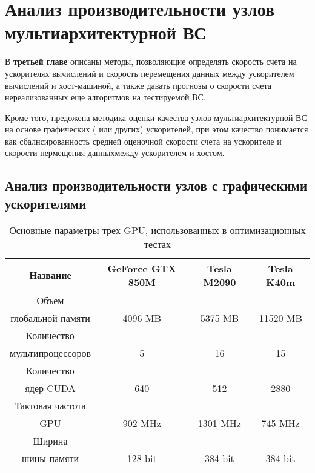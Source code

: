 \chapter{Анализ производительности узлов мультиархитектурной ВС} \label{chapt3}
В \textbf{третьей главе} описаны методы, позволяющие определять скорость счета на ускорителях вычислений и скорость перемещения данных между ускорителем вычислений и хост-машиной, а также давать прогнозы о скорости счета нереализованных еще алгоритмов на тестируемой ВС.

Кроме того, предожена методика оценки качества узлов мультиархитектурной ВС на основе графических ( или других) ускорителей, при этом качество понимается как сбалнсированность средней оценочной скорости счета на ускорителе и скорости пермещения данныхмежду ускорителем и хостом. 

\section{Анализ производительности узлов с графическими ускорителями} \label{sect3_1}

\begin{table}[ht]
	\begin{center}
		\caption{Основные параметры трех GPU, использованных в оптимизационных тестах}
		\begin{tabular}{|c|c|c|c|}
			\hline
			Название                &  GeForce GTX 850M & Tesla M2090 & Tesla K40m \\ \hline
			Объем                  &                   &             &             \\
			глобальной памяти       & 4096 MB           & 5375 MB     & 11520 MB \\ \hline
			Количество              &             &               &     \\
			мультипроцессоров       & 5           &  16           & 15  \\ \hline
			Количество              &             &               &     \\
			ядер CUDA               & 640         & 512         & 2880  \\ \hline
			Тактовая частота        &             &             &         \\
			GPU                     & 902 MHz     & 1301 MHz    & 745 MHz \\ \hline
			Ширина                  &             &             &         \\
			шины памяти             & 128-bit     & 384-bit     & 384-bit \\ \hline
		\end{tabular}
		\label{GPUs}
	\end{center}
\end{table}


